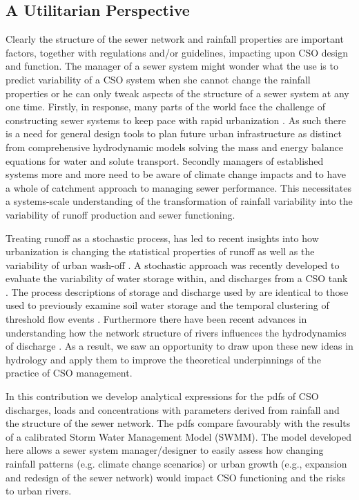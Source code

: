 \documentclass{agujournal2018}
\begin{document}
\subsection{A Utilitarian Perspective}
Clearly the structure of the sewer network and rainfall properties are important factors, together with regulations and/or guidelines, impacting upon CSO design and function. The manager of a sewer system might wonder what the use is to predict variability of a CSO system when she cannot change the rainfall properties or he can only tweak aspects of the structure of a sewer system at any one time. Firstly, in response, many parts of the world face the challenge of constructing sewer systems to keep pace with rapid urbanization \citep{xu2019urban}. As such there is a need for general design tools to plan future urban infrastructure as distinct from comprehensive hydrodynamic models solving the mass and energy balance equations for water and solute transport. Secondly managers of established systems more and more need to be aware of climate change impacts and to have a whole of catchment approach to managing sewer performance. This necessitates a systems-scale understanding of the transformation of rainfall variability into the variability of runoff production and sewer functioning.

Treating runof\/f as a stochastic process,  has led to recent insights into how urbanization is changing the statistical properties of runof\/f as well as the variability of urban wash-of\/f \citep{Daly_2014,Mej_a_2014}. A  stochastic approach was recently developed to evaluate the variability of water storage within, and discharges from a CSO tank \citep{Wang_2018}. The process descriptions of storage and discharge used by \citet{Wang_2018} are identical to those used to previously examine soil water storage \citep{McGrath_2007,Milly_1993} and the temporal clustering of threshold f\/low events \citep{Aquino_2017, Laio_2001, McGrath_2007}. Furthermore there have been recent advances in understanding how the network structure of rivers influences the hydrodynamics of discharge \citep{Biswal_2010}. As a result, we saw an opportunity to draw upon these new ideas in hydrology and apply them to improve the theoretical underpinnings of the practice of CSO management.  

In this contribution we develop analytical expressions for the pdfs of CSO discharges, loads and concentrations with parameters derived from rainfall and the structure of the sewer network. The pdfs compare favourably with the results of a calibrated Storm Water Management Model (SWMM). The model developed here allows a sewer system manager/designer to easily assess how changing rainfall patterns (e.g. climate change scenarios) or urban growth (e.g., expansion and redesign of the sewer network) would impact CSO functioning and the risks to urban rivers.
 
\end{document}
